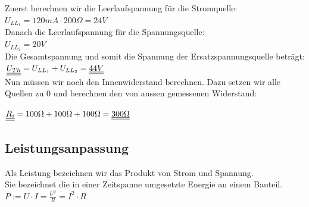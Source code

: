 \begin{center}
	\fix
\end{center}
\iend
{}
\beginbsp																				Zuerst berechnen wir die Leerlaufspannung für die Stromquelle: \\
$U_{LL_1} = 120mA \cdot 200 \Omega = 24V$ \\
Danach die Leerlaufspannung für die Spannungsquelle: \\
$ U_{LL_2} = 20V$\\
Die Gesamtspannung und somit die Spannung der Ersatzspannungsquelle beträgt: \\
$\underline{\underline{U_{Th}}} = U_{LL_1} + U_{LL_2} = \underline{\underline{44V}}$ \\

Nun müssen wir noch den Innenwiderstand berechnen. Dazu setzen wir alle Quellen zu 0 und berechnen den von aussen gemessenen Widerstand:\\
\begin{center}
	\fix
\end{center}
$\underline{\underline{R_i}} = 100\Omega + 100\Omega  + 100\Omega  = \underline{\underline{300 \Omega}} $
\iend

\newpage
\subsection{Leistungsanpassung}
\beginip
Als Leistung bezeichnen wir das Produkt von Strom und Spannung. \\
Sie bezeichnet die in einer Zeitspanne umgesetzte Energie an einem Bauteil. \\
\formulaBegin
$\displaystyle P := U \cdot I = \frac{U^2}{R} = I^2 \cdot R $
\formulaEnd
\iend

